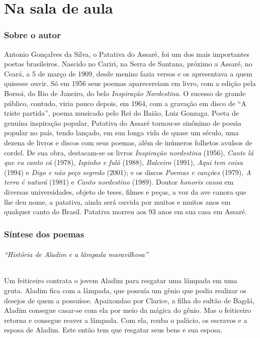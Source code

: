 \part{Na sala de aula}

\paginabranca

\section{Sobre o autor}

Antonio Gonçalves da Silva, o Patativa do Assaré, foi um dos mais importantes
poetas brasileiros. Nascido no Cariri, na Serra de Santana, próximo a Assaré,
no Ceará, a 5 de março de 1909, desde menino fazia versos e os apresentava a
quem quisesse ouvir. Só em 1956 seus poemas aparecereiam em livro, com a edição
pela Borsoi, do Rio de Janeiro, do belo \textit{Inspiração Nordestina}. O
sucesso de grande público, contudo, viria pouco depois, em 1964, com a gravação
em disco de ``A triste partida'', poema musicado pelo Rei do Baião, Luiz
Gonzaga. Poeta de genuína inspiração popular, Patativa do Assaré tornou-se
sinônimo de poesia popular no país, tendo lançado, em sua longa vida de quase
um século, uma dezena de livros e discos com seus poemas, além de inúmeros
folhetos avulsos de cordel. De sua obra, destacam-se os livros
\textit{Inspiração nordestina} (1956), \textit{Cante lá que eu canto cá}
(1978), \textit{Ispinho e fulô} (1988), \textit{Balceiro} (1991), \textit{Aqui
tem coisa} (1994) e \textit{Digo e não peço segredo} (2001); e os discos
\textit{Poemas e canções} (1979), \textit{A terra é naturá} (1981) e
\textit{Canto nordestino} (1989). Doutor \textit{honoris causa} em diversas
universidades, objeto de teses, filmes e peças, a voz da ave canora que lhe deu
nome, a patativa, ainda será ouvida por muitos e muitos anos em qualquer canto
do Brasil. Patativa morreu aos 93 anos em sua casa em Assaré.

\section{Síntese dos poemas}

\medskip

\paragraph{“História de Aladim e a lâmpada maravilhosa”} Um feiticeiro contrata
o jovem Aladim para resgatar uma lâmpada em uma gruta. Aladim fica com a
lâmpada, que possuía um gênio que podia realizar os desejos de quem a
possuísse. Apaixondao por Clarice, a filha do sultão de Bagdá, Aladim consegue
casar-se com ela por meio da mágica do gênio. Mas o feiticeiro retorna e
consegue reaver a lâmpada. Com ela, rouba o palácio, os escravos e a esposa de
Aladim. Este então tem que resgatar seus bens e sua esposa. 

